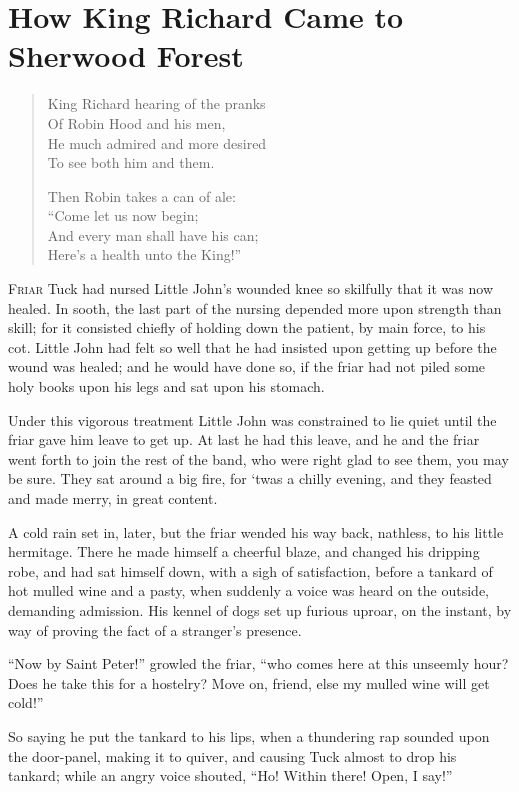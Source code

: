 \chapter{How King Richard Came to Sherwood Forest}

\begin{quote}
King Richard hearing of the pranks\\
Of Robin Hood and his men,\\
He much admired and more desired\\
To see both him and them.

Then Robin takes a can of ale:\\
“Come let us now begin;\\
And every man shall have his can;\\
Here’s a health unto the King!”
\end{quote}

\lettrine{F}{riar} Tuck had nursed Little John's wounded knee so skilfully that it
was now healed. In sooth, the last part of the nursing depended more
upon strength than skill; for it consisted chiefly of holding down the
patient, by main force, to his cot. Little John had felt so well that he
had insisted upon getting up before the wound was healed; and he would
have done so, if the friar had not piled some holy books upon his legs
and sat upon his stomach.

Under this vigorous treatment Little John was constrained to lie quiet
until the friar gave him leave to get up. At last he had this leave, and
he and the friar went forth to join the rest of the band, who were right
glad to see them, you may be sure. They sat around a big fire, for `twas
a chilly evening, and they feasted and made merry, in great content.

A cold rain set in, later, but the friar wended his way back, nathless,
to his little hermitage. There he made himself a cheerful blaze, and
changed his dripping robe, and had sat himself down, with a sigh of
satisfaction, before a tankard of hot mulled wine and a pasty, when
suddenly a voice was heard on the outside, demanding admission. His
kennel of dogs set up furious uproar, on the instant, by way of proving
the fact of a stranger's presence.

``Now by Saint Peter!'' growled the friar, ``who comes here at this
unseemly hour? Does he take this for a hostelry? Move on, friend, else
my mulled wine will get cold!''

So saying he put the tankard to his lips, when a thundering rap sounded
upon the door-panel, making it to quiver, and causing Tuck almost to
drop his tankard; while an angry voice shouted, ``Ho! Within there!
Open, I say!''

